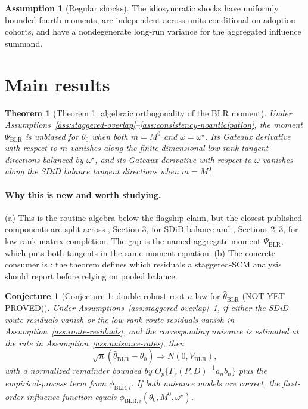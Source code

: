 \documentclass[11pt]{article}
\theoremstyle{definition}
\newtheorem{assumption}{Assumption}
\theoremstyle{plain}
\newtheorem{theorem}{Theorem}
\newtheorem{conjecture}{Conjecture}
\theoremstyle{remark}
\begin{document}
\begin{assumption}[Regular shocks]\label{ass:regular-shocks}
The idiosyncratic shocks have uniformly bounded fourth moments, are independent
across units conditional on adoption cohorts, and have a nondegenerate
long-run variance for the aggregated influence summand.
\end{assumption}

\section{Main results}
\begin{theorem}[Theorem 1: algebraic orthogonality of the BLR moment]\label{thm:score-orthogonal}
Under Assumptions~\ref{ass:staggered-overlap}--\ref{ass:consistency-noanticipation}, the moment
$\Psi_{\mathrm{BLR}}$ is unbiased for $\theta_0$ when both $m=M^0$ and
$\omega=\omega^\star$. Its Gateaux derivative with respect to $m$ vanishes
along the finite-dimensional low-rank tangent directions balanced by
$\omega^\star$, and its Gateaux derivative with respect to $\omega$ vanishes
along the SDiD balance tangent directions when $m=M^0$.
\end{theorem}
\paragraph{Why this is new and worth studying.}
(a) This is the routine algebra below the flagship claim, but the closest
published components are split across \citet{ArkhangelskyAtheyHirshbergImbensWager2021},
Section 3, for SDiD balance and
\citet{AtheyBayatiDoudchenkoImbensKhosravi2021}, Sections 2--3, for
low-rank matrix completion. The gap is the named aggregate moment
$\Psi_{\mathrm{BLR}}$, which puts both tangents in the same moment equation.
(b) The concrete consumer is \citet{BenMichaelFellerRothstein2022}: the theorem
defines which residuals a staggered-SCM analysis should report before relying
on pooled balance.

\begin{conjecture}[Conjecture 1: double-robust root-\(n\) law for \(\widehat\theta_{\mathrm{BLR}}\) (NOT YET PROVED)]\label{conj:double-robust-rate}
Under Assumptions~\ref{ass:staggered-overlap}--\ref{ass:regular-shocks}, if
either the SDiD route residuals vanish or the low-rank route residuals vanish
in Assumption~\ref{ass:route-residuals}, and the corresponding nuisance is
estimated at the rate in Assumption~\ref{ass:nuisance-rates},
then
\[
  \sqrt n(\widehat\theta_{\mathrm{BLR}}-\theta_0)
  \Rightarrow N(0,V_{\mathrm{BLR}}),
\]
with a normalized remainder bounded by
$O_p\{\Gamma_r(P,D)^{-1}a_nb_n\}$ plus the empirical-process term from
$\phi_{\mathrm{BLR},i}$. If both nuisance models are correct, the first-order
influence function equals
$\phi_{\mathrm{BLR},i}(\theta_0,M^0,\omega^\star)$.
\end{conjecture}
\end{document}
